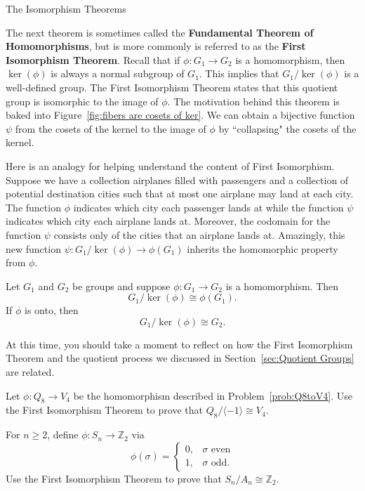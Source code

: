 \begin{section}{The Isomorphism Theorems}

The next theorem is sometimes called the \textbf{Fundamental Theorem of Homomorphisms}, but is more commonly is referred to as the \textbf{First Isomorphism Theorem}. Recall that if $\phi:G_1\to G_2$ is a homomorphism, then $\ker(\phi)$ is always a normal subgroup of $G_1$.  This implies that $G_1/\ker(\phi)$ is a well-defined group.  The First Isomorphism Theorem states that this quotient group is isomorphic to the image of $\phi$. The motivation behind this theorem is baked into Figure~\ref{fig:fibers are cosets of ker}. We can obtain a bijective function $\psi$ from the cosets of the kernel to the image of $\phi$ by ``collapsing" the cosets of the kernel.

Here is an analogy for helping understand the content of First Isomorphism.  Suppose we have a collection airplanes filled with passengers and a collection of potential destination cities such that at most one airplane may land at each city.  The function $\phi$ indicates which city each passenger lands at while the function $\psi$ indicates which city each airplane lands at.  Moreover, the codomain for the function $\psi$ consists only of the cities that an airplane lands at. Amazingly, this new function $\psi:G_1/\ker(\phi)\to \phi(G_1)$ inherits the homomorphic property from $\phi$.

\begin{theorem}
Let $G_1$ and $G_2$ be groups and suppose $\phi:G_1\to G_2$ is a homomorphism. Then
\[
G_1/\ker(\phi)\cong \phi(G_1).
\]
If $\phi$ is onto, then
\[
G_1/\ker(\phi)\cong G_2.
\]
\end{theorem}

At this time, you should take a moment to reflect on how the First Isomorphism Theorem and the quotient process we discussed in Section~\ref{sec:Quotient Groups} are related.

\begin{problem}
Let $\phi:Q_8\to V_4$ be the homomorphism described in Problem~\ref{prob:Q8toV4}. Use the First Isomorphism Theorem to prove that $Q_8/\langle-1\rangle\cong V_4$.
\end{problem}

\begin{problem}
For $n\geq 2$, define $\phi:S_n\to \mathbb{Z}_2$ via
\[
\phi(\sigma)=\begin{cases}
0, & \sigma \text{ even}\\
1, & \sigma \text{ odd}.
\end{cases}
\]
Use the First Isomorphism Theorem to prove that $S_n/A_n\cong \mathbb{Z}_2$.
\end{problem}


\end{section}
